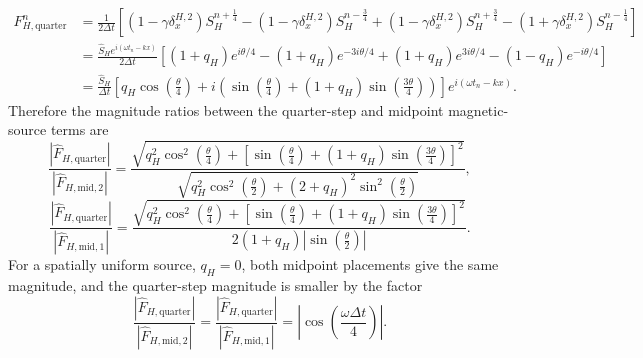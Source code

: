 \documentclass{article}
\numberwithin{figure}{section}
\begin{document}
\begin{equation}
    \begin{aligned} F_{H,\mathrm{quarter}}^n & =\frac{1}{2\Delta t}\left[\left(1-\gamma\delta_x^{H,2}\right)S_H^{n+\frac{1}{4}}-\left(1-\gamma\delta_x^{H,2}\right)S_H^{n-\frac{3}{4}}+\left(1-\gamma\delta_x^{H,2}\right)S_H^{n+\frac{3}{4}}-\left(1+\gamma\delta_x^{H,2}\right)S_H^{n-\frac{1}{4}}\right] \\
                                         & =\frac{\widehat{S}_H e^{i(\omega t_n-kx)}}{2\Delta t}\left[\left(1+q_H\right)e^{i\theta/4}-\left(1+q_H\right)e^{-3i\theta/4}+\left(1+q_H\right)e^{3i\theta/4}-\left(1-q_H\right)e^{-i\theta/4}\right]                                                        \\
                                         & =\frac{\widehat{S}_H}{\Delta t}\left[q_H\cos\left(\frac{\theta}{4}\right)+i\left(\sin\left(\frac{\theta}{4}\right)+\left(1+q_H\right)\sin\left(\frac{3\theta}{4}\right)\right)\right]e^{i(\omega t_n-kx)}.
    \end{aligned} \label{eq:hsource-quarter-source-amplitude}
\end{equation}
Therefore the magnitude ratios between the quarter-step and midpoint magnetic-source terms are
\begin{equation}
    \frac{\left|\widehat{F}_{H,\mathrm{quarter}}\right|}{\left|\widehat{F}_{H,\mathrm{mid,2}}\right|}=\frac{\sqrt{q_H^{2}\cos^{2}\left(\frac{\theta}{4}\right)+\left[\sin\left(\frac{\theta}{4}\right)+\left(1+q_H\right)\sin\left(\frac{3\theta}{4}\right)\right]^{2}}}{\sqrt{q_H^{2}\cos^{2}\left(\frac{\theta}{2}\right)+\left(2+q_H\right)^{2}\sin^{2}\left(\frac{\theta}{2}\right)}}, \label{eq:hsource-source-magnitude-ratio-both}
\end{equation}
\begin{equation}
    \frac{\left|\widehat{F}_{H,\mathrm{quarter}}\right|}{\left|\widehat{F}_{H,\mathrm{mid,1}}\right|}=\frac{\sqrt{q_H^2\cos^2\left(\frac{\theta}{4}\right)+\left[\sin\left(\frac{\theta}{4}\right)+\left(1+q_H\right)\sin\left(\frac{3\theta}{4}\right)\right]^2}}{2\left(1+q_H\right)\left|\sin\left(\frac{\theta}{2}\right)\right|}. \label{eq:hsource-source-magnitude-ratio}
\end{equation}
For a spatially uniform source, $q_H=0$, both midpoint placements give the same magnitude, and the quarter-step magnitude is smaller by the factor
\begin{equation}
    \frac{\left|\widehat{F}_{H,\mathrm{quarter}}\right|}{\left|\widehat{F}_{H,\mathrm{mid,2}}\right|}=\frac{\left|\widehat{F}_{H,\mathrm{quarter}}\right|}{\left|\widehat{F}_{H,\mathrm{mid,1}}\right|}=\left|\cos\left(\frac{\omega\Delta t}{4}\right)\right|. \label{eq:hsource-uniform-source-magnitude-ratio}
\end{equation}
\end{document}
